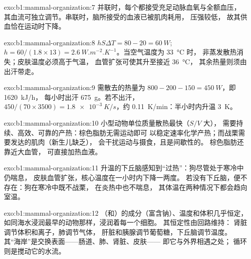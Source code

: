 \begin{solution}{exo:b1:mammal-organization:7}
并联时，每个都接受充足动脉血氧与全额血压，
其血流可独立调节。串联时，脑所接受的血液已被肌肉耗用，
压强较低，
故其供血恰在运动时下降。
\end{solution}

\begin{solution}{exo:b1:mammal-organization:8}
$hS\Delta T = 80 - 20 = \qty{60}{W}$; $h = 60/(1.8\times 13) =
\qty{2.6}{W.m^{-2}.K^{-1}}$。当空气温度为 \qty{33}{\celsius} 时，
非蒸发散热消失；皮肤温度必须高于气温，
血管扩张可使其升至接近 \qty{36}{\celsius}，
其余热量则须由出汗带走。
\end{solution}

\begin{solution}{exo:b1:mammal-organization:9}
需散去的热量为 $800 - 200 - 150 = \qty{450}{W}$，即 \qty{1620}{kJ/h}，
每小时出汗 \qty{675}{g}。若不出汗，$450/(70\times 3500) =
\qty{1.8e-3}{K/s}$，约 \qty{0.11}{K/min}：半小时内升温 \qty{3}{K}。
\end{solution}

\begin{solution}{exo:b1:mammal-organization:10}
小型动物单位质量散热最快（$S/V$ 大），
需要持续、高效、可靠的产热：棕色脂肪无需运动即可
以稳定速率化学产热；而战栗需要发达的肌肉（新生儿缺乏），
会干扰运动与摄食，且是间歇性的。
棕色脂肪还靠近大血管，
可直接加热血液。
\end{solution}

\begin{solution}{exo:b1:mammal-organization:11}
升温的下丘脑感知到“过热”：狗尽管处于寒冷中仍喘息，
皮肤血管扩张，核心温度在一小时内下降一两度。
若没有下丘脑，便不存在：狗在寒冷中既不战栗，
在炎热中也不喘息，
其体温在两种情况下都会趋向室温。
\end{solution}

\begin{solution}{exo:b1:mammal-organization:12}
（和）的成分（富含钠）、温度和体积几乎恒定，
如同海水浸润最早的动物那样，浸润着每一个细胞。
其恒定性由回路维持：
肾脏调节体积和离子，肺调节气体，
肝脏和胰腺调节葡萄糖，下丘脑调节温度。
其“海岸”是交换表面——肠道、肺、肾脏、皮肤——
即它与外界相遇之处；
循环则是搅动它的水流。
\end{solution}

